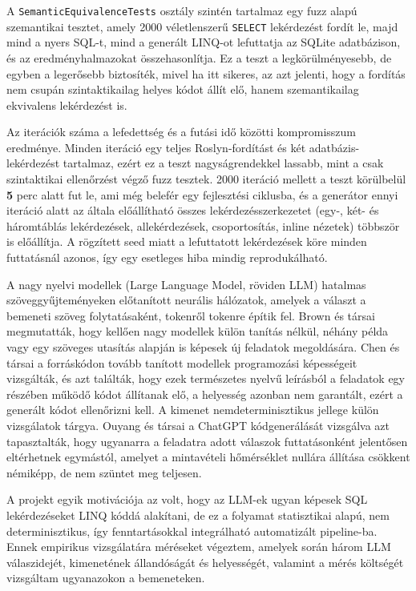 A \texttt{SemanticEquivalenceTests} osztály szintén tartalmaz egy fuzz alapú szemantikai tesztet, amely 2000 véletlenszerű \texttt{SELECT} lekérdezést fordít le, majd mind a nyers SQL-t, mind a generált LINQ-ot lefuttatja az SQLite adatbázison, és az eredményhalmazokat összehasonlítja. Ez a teszt a legkörülményesebb, de egyben a legerősebb biztosíték, mivel ha itt sikeres, az azt jelenti, hogy a fordítás nem csupán szintaktikailag helyes kódot állít elő, hanem szemantikailag ekvivalens lekérdezést is.

Az iterációk száma a lefedettség és a futási idő közötti kompromisszum eredménye. Minden iteráció egy teljes Roslyn-fordítást és két adatbázis-lekérdezést tartalmaz, ezért ez a teszt nagyságrendekkel lassabb, mint a csak szintaktikai ellenőrzést végző fuzz tesztek. 2000 iteráció mellett a teszt körülbelül \textbf{5} perc alatt fut le, ami még belefér egy fejlesztési ciklusba, és a generátor ennyi iteráció alatt az általa előállítható összes lekérdezésszerkezetet (egy-, két- és háromtáblás lekérdezések, allekérdezések, csoportosítás, inline nézetek) többször is előállítja. A rögzített seed miatt a lefuttatott lekérdezések köre minden futtatásnál azonos, így egy esetleges hiba mindig reprodukálható.

\label{chap:llm}

A nagy nyelvi modellek (Large Language Model, röviden LLM) hatalmas szöveggyűjteményeken előtanított neurális hálózatok, amelyek a választ a bemeneti szöveg folytatásaként, tokenről tokenre építik fel. Brown és társai \cite{brown2020gpt3} megmutatták, hogy kellően nagy modellek külön tanítás nélkül, néhány példa vagy egy szöveges utasítás alapján is képesek új feladatok megoldására. Chen és társai \cite{chen2021codex} a forráskódon tovább tanított modellek programozási képességeit vizsgálták, és azt találták, hogy ezek természetes nyelvű leírásból a feladatok egy részében működő kódot állítanak elő, a helyesség azonban nem garantált, ezért a generált kódot ellenőrizni kell. A kimenet nemdeterminisztikus jellege külön vizsgálatok tárgya. Ouyang és társai \cite{ouyang2025nondeterminism} a ChatGPT kódgenerálását vizsgálva azt tapasztalták, hogy ugyanarra a feladatra adott válaszok futtatásonként jelentősen eltérhetnek egymástól, amelyet a mintavételi hőmérséklet nullára állítása csökkent némiképp, de nem szüntet meg teljesen.

A projekt egyik motivációja az volt, hogy az LLM-ek ugyan képesek SQL lekérdezéseket LINQ kóddá alakítani, de ez a folyamat statisztikai alapú, nem determinisztikus, így fenntartásokkal integrálható automatizált pipeline-ba. Ennek empirikus vizsgálatára méréseket végeztem, amelyek során három LLM válaszidejét, kimenetének állandóságát és helyességét, valamint a mérés költségét vizsgáltam ugyanazokon a bemeneteken.

